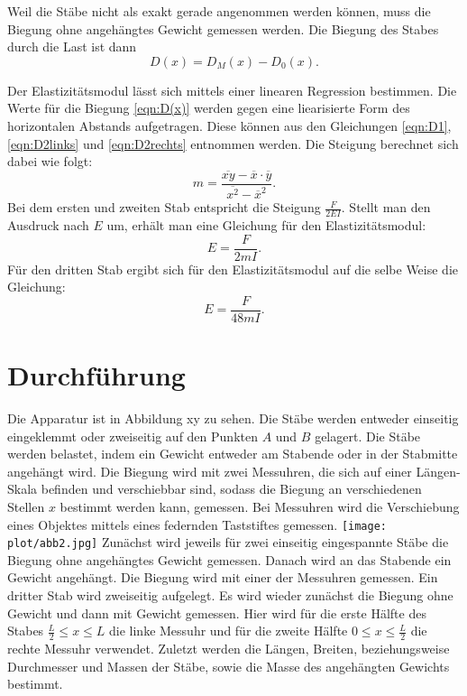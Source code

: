 \noindent Weil die Stäbe nicht als exakt gerade angenommen werden können,
muss die Biegung ohne angehängtes Gewicht gemessen werden.
Die Biegung des Stabes durch die Last ist dann 
\begin{equation}
D(x) = D_{M}(x) - D_{0}(x).
\label{eqn:D(x)}
\end{equation}

\noindent Der Elastizitätsmodul lässt sich mittels einer
linearen Regression bestimmen. Die Werte für die Biegung \eqref{eqn:D(x)}
werden gegen eine liearisierte Form des horizontalen Abstands aufgetragen.
Diese können aus den Gleichungen \eqref{eqn:D1}, \eqref{eqn:D2links} und \eqref{eqn:D2rechts} entnommen werden.
Die Steigung berechnet sich dabei wie folgt:
\begin{equation}
m = \frac{\overline{xy} - \overline{x} \cdot \overline{y}}{\overline{x^2} - \overline{x}^2}.
\label{eqn:m}
\end{equation} %
Bei dem ersten und zweiten Stab entspricht die Steigung
$\frac{F}{2EI}$.
Stellt man den Ausdruck nach $E$ um, erhält man
eine Gleichung für den Elastizitätsmodul:
\begin{equation}
E = \frac{F}{2mI}.
\label{eqn:E12}
\end{equation}
Für den dritten Stab ergibt sich für den Elastizitätsmodul auf die
selbe Weise die Gleichung:
\begin{equation}
E = \frac{F}{48mI}.
\label{eqn:E3}
\end{equation}

\section{Durchführung}
Die Apparatur ist in Abbildung xy zu sehen. %
Die Stäbe werden entweder einseitig eingeklemmt oder zweiseitig
auf den Punkten $A$ und $B$ gelagert. Die Stäbe werden belastet, indem
ein Gewicht entweder am Stabende oder in der Stabmitte angehängt wird.
Die Biegung wird mit zwei Messuhren, die sich auf einer Längen-Skala befinden
und verschiebbar sind, sodass die Biegung an verschiedenen Stellen $x$ bestimmt
werden kann, gemessen. Bei Messuhren wird die Verschiebung eines Objektes mittels
eines federnden Taststiftes gemessen. %
\texttt{[image: plot/abb2.jpg]}
Zunächst wird jeweils für zwei einseitig eingespannte Stäbe die Biegung ohne
angehängtes Gewicht gemessen. Danach wird an das Stabende ein Gewicht angehängt.
Die Biegung wird mit einer der Messuhren gemessen. %
Ein dritter Stab wird
zweiseitig aufgelegt. Es wird wieder zunächst die Biegung ohne Gewicht und dann
mit Gewicht gemessen. Hier wird für die erste Hälfte des Stabes $\frac{L}{2} \leq x \leq L$
die linke Messuhr und für die zweite Hälfte $0 \leq x \leq \frac{L}{2}$ die rechte Messuhr
verwendet. %
Zuletzt werden die Längen, Breiten, beziehungsweise Durchmesser und Massen der Stäbe,
sowie die Masse des angehängten Gewichts bestimmt.


\newpage



\nocite{*}
\newpage
\printbibliography


